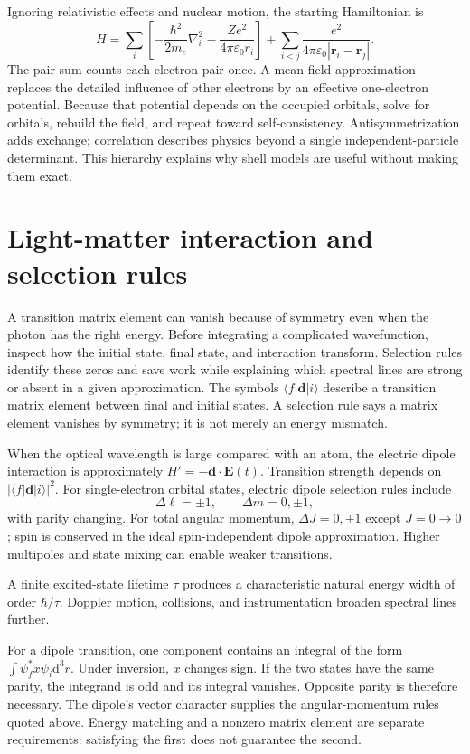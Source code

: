 \documentclass[11pt,oneside]{book}
\newcommand{\dd}{\mathrm{d}}
\newcommand{\vect}[1]{\boldsymbol{#1}}
\newcommand{\lap}{\nabla^2}
\newcommand{\ket}[1]{\lvert #1\rangle}
\newcommand{\bra}[1]{\langle #1\rvert}
\newcommand{\eps}{\varepsilon_0}
\theoremstyle{reviewstyle}
\begin{document}
Ignoring relativistic effects and nuclear motion, the starting Hamiltonian is
\begin{equation}
H=\sum_i\left[-\frac{\hbar^2}{2m_e}\lap_i-\frac{Ze^2}{4\pi\eps r_i}\right]
+\sum_{i<j}\frac{e^2}{4\pi\eps|\vect r_i-\vect r_j|}.
\end{equation}
The pair sum counts each electron pair once. A mean-field approximation replaces the detailed influence of other electrons by an effective one-electron potential. Because that potential depends on the occupied orbitals, solve for orbitals, rebuild the field, and repeat toward self-consistency. Antisymmetrization adds exchange; correlation describes physics beyond a single independent-particle determinant. This hierarchy explains why shell models are useful without making them exact.

\section{Light-matter interaction and selection rules}
A transition matrix element can vanish because of symmetry even when the photon has the right energy. Before integrating a complicated wavefunction, inspect how the initial state, final state, and interaction transform. Selection rules identify these zeros and save work while explaining which spectral lines are strong or absent in a given approximation. The symbols $\bra f\vect d\ket i$ describe a transition matrix element between final and initial states. A selection rule says a matrix element vanishes by symmetry; it is not merely an energy mismatch.

When the optical wavelength is large compared with an atom, the electric dipole interaction is approximately $H'=-\vect d\cdot\vect E(t)$. Transition strength depends on $|\bra f\vect d\ket i|^2$. For single-electron orbital states, electric dipole selection rules include
\begin{equation}\Delta\ell=\pm1,\qquad \Delta m=0,\pm1,\end{equation}
with parity changing. For total angular momentum, $\Delta J=0,\pm1$ except $J=0\to0$; spin is conserved in the ideal spin-independent dipole approximation. Higher multipoles and state mixing can enable weaker transitions.

A finite excited-state lifetime $\tau$ produces a characteristic natural energy width of order $\hbar/\tau$. Doppler motion, collisions, and instrumentation broaden spectral lines further.

For a dipole transition, one component contains an integral of the form $\int\psi_f^*x\psi_i\dd^3r$. Under inversion, $x$ changes sign. If the two states have the same parity, the integrand is odd and its integral vanishes. Opposite parity is therefore necessary. The dipole's vector character supplies the angular-momentum rules quoted above. Energy matching and a nonzero matrix element are separate requirements: satisfying the first does not guarantee the second.
\end{document}
